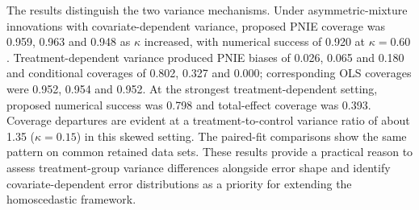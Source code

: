 The results distinguish the two variance mechanisms. Under asymmetric-mixture innovations with covariate-dependent variance, proposed PNIE coverage was 0.959, 0.963 and 0.948 as $\kappa$ increased, with numerical success of 0.920 at $\kappa=0.60$. Treatment-dependent variance produced PNIE biases of 0.026, 0.065 and 0.180 and conditional coverages of 0.802, 0.327 and 0.000; corresponding OLS coverages were 0.952, 0.954 and 0.952. At the strongest treatment-dependent setting, proposed numerical success was 0.798 and total-effect coverage was 0.393. Coverage departures are evident at a treatment-to-control variance ratio of about 1.35 ($\kappa=0.15$) in this skewed setting. The paired-fit comparisons show the same pattern on common retained data sets. These results provide a practical reason to assess treatment-group variance differences alongside error shape and identify covariate-dependent error distributions as a priority for extending the homoscedastic framework.
